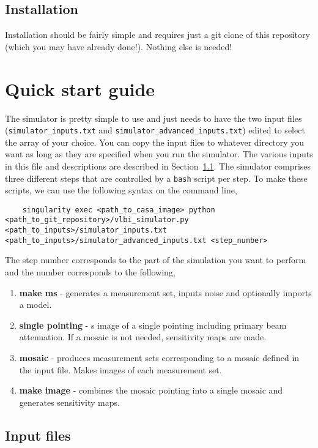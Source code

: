 \documentclass[11pt]{report_jfr}
\begin{document}
\subsection{Installation}

Installation should be fairly simple and requires just a git clone of this repository (which you may have already done!). Nothing else is needed!

\section{Quick start guide}

The simulator is pretty simple to use and just needs to have the two input files (\texttt{simulator\_inputs.txt} and \texttt{simulator\_advanced\_inputs.txt}) edited to select the array of your choice. You can copy the input files to whatever directory you want as long as they are specified when you run the simulator. The various inputs in this file and descriptions are described in Section~\ref{ss:inputfile}. The simulator comprises three different steps that are controlled by a \texttt{bash} script per step. To make these scripts, we can use the following syntax on the command line,
%
\begin{lstlisting}
	singularity exec <path_to_casa_image> python <path_to_git_repository>/vlbi_simulator.py <path_to_inputs>/simulator_inputs.txt <path_to_inputs>/simulator_advanced_inputs.txt <step_number>
\end{lstlisting}
%
The step number corresponds to the part of the simulation you want to perform and the number corresponds to the following,
%
\begin{enumerate}
	\item \textbf{make ms} - generates a measurement set, inputs noise and optionally imports a model.
	\item \textbf{single pointing} - s image of a single pointing including primary beam attenuation. If a mosaic is not needed, sensitivity maps are made.
	\item \textbf{mosaic} - produces measurement sets corresponding to a mosaic defined in the input file. Makes images of each measurement set.
	\item \textbf{make image} - combines the mosaic pointing into a single mosaic and generates sensitivity maps.
\end{enumerate}

\subsection{Input files}\label{ss:inputfile}
\end{document}
